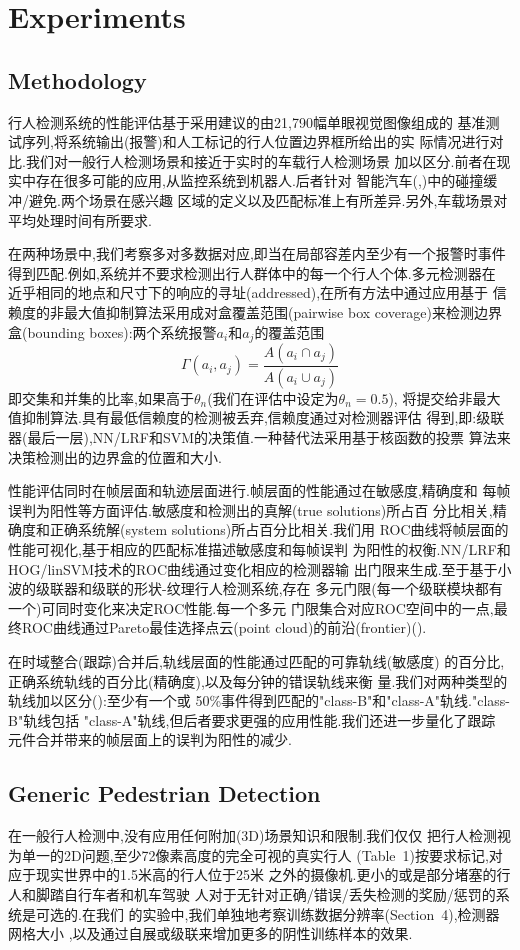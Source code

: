 \documentclass[10pt,letterpaper,journal,compsoc]{IEEEtran}
\begin{document}
\section{Experiments}
\subsection{Methodology}
行人检测系统的性能评估基于采用建议的由21,790幅单眼视觉图像组成的
基准测试序列,将系统输出(报警)和人工标记的行人位置边界框所给出的实
际情况进行对比.我们对一般行人检测场景和接近于实时的车载行人检测场景
加以区分.前者在现实中存在很多可能的应用,从监控系统到机器人.后者针对
智能汽车(\cite{bib20},\cite{bib23})中的碰撞缓冲/避免.两个场景在感兴趣
区域的定义以及匹配标准上有所差异.另外,车载场景对平均处理时间有所要求.

在两种场景中,我们考察多对多数据对应,即当在局部容差内至少有一个报警时事件
得到匹配.例如,系统并不要求检测出行人群体中的每一个行人个体.多元检测器在
近乎相同的地点和尺寸下的响应的寻址(addressed),在所有方法中通过应用基于
信赖度的非最大值抑制算法采用成对盒覆盖范围(pairwise box coverage)来检测边界
盒(bounding boxes):两个系统报警$a_i$和$a_j$的覆盖范围
\[\Gamma(a_i,a_j)=\frac{A(a_i\cap{}a_j)}{A(a_i\cup{}a_j)}\]
即交集和并集的比率,如果高于$\theta_n$(我们在评估中设定为$\theta_n=0.5$),
将提交给非最大值抑制算法.具有最低信赖度的检测被丢弃,信赖度通过对检测器评估
得到,即:级联器(最后一层),NN/LRF和SVM的决策值.一种替代法采用基于核函数的投票
算法来决策检测出的边界盒的位置和大小.

性能评估同时在帧层面和轨迹层面进行.帧层面的性能通过在敏感度,精确度和
每帧误判为阳性等方面评估.敏感度和检测出的真解(true solutions)所占百
分比相关,精确度和正确系统解(system solutions)所占百分比相关.我们用
ROC曲线将帧层面的性能可视化,基于相应的匹配标准描述敏感度和每帧误判
为阳性的权衡.NN/LRF和HOG/linSVM技术的ROC曲线通过变化相应的检测器输
出门限来生成.至于基于小波的级联器和级联的形状-纹理行人检测系统,存在
多元门限(每一个级联模块都有一个)可同时变化来决定ROC性能.每一个多元
门限集合对应ROC空间中的一点,最终ROC曲线通过Pareto最佳选择点云(point 
cloud)的前沿(frontier)(\cite{bib23}).

在时域整合(跟踪)合并后,轨线层面的性能通过匹配的可靠轨线(敏感度)
的百分比,正确系统轨线的百分比(精确度),以及每分钟的错误轨线来衡
量.我们对两种类型的轨线加以区分(\cite{bib23}):至少有一个或
50\%事件得到匹配的"class-B"和"class-A"轨线."class-B"轨线包括
"class-A"轨线,但后者要求更强的应用性能.我们还进一步量化了跟踪
元件合并带来的帧层面上的误判为阳性的减少.
\subsection{Generic Pedestrian Detection}
在一般行人检测中,没有应用任何附加(3D)场景知识和限制.我们仅仅
把行人检测视为单一的2D问题,至少72像素高度的完全可视的真实行人
(Table~1)按要求标记,对应于现实世界中的1.5米高的行人位于25米
之外的摄像机.更小的或是部分堵塞的行人和脚踏自行车者和机车驾驶
人对于无针对正确/错误/丢失检测的奖励/惩罚的系统是可选的.在我们
的实验中,我们单独地考察训练数据分辨率(Section~4),检测器网格大小
,以及通过自展或级联来增加更多的阴性训练样本的效果.
\end{document}
